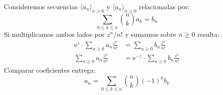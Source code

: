   Consideremos secuencias \(\langle a_n \rangle_{n \ge 0}\)
  y \(\langle a_n \rangle_{n \ge 0}\)
  relacionadas por:
  \begin{equation}
    \label{eq:b=binomial-transform-a}
    \sum_{0 \le k \le n} \binom{n}{k} a_k
      = b_n
  \end{equation}
  Si multiplicamos ambos lados por \(z^n / n!\)
  y sumamos sobre \(n \ge 0\)
  resulta:
  \begin{align*}
    \mathrm{e}^z \cdot \sum_{n \ge 0} a_n \frac{z^n}{n!}
      &= \sum_{n \ge 0} b_n \frac{z^n}{n!} \\
    \sum_{n \ge 0} a_n \frac{z^n}{n!}
      &= \mathrm{e}^{-z} \cdot \sum_{n \ge 0} b_n \frac{z^n}{n!}
  \end{align*}
  Comparar coeficientes entrega:
  \begin{equation}
    \label{eq:a=inverse-binomial-transform-b}
    a_n
      = \sum_{0 \le k \le n} \binom{n}{k} (-1)^k b_k
  \end{equation}

